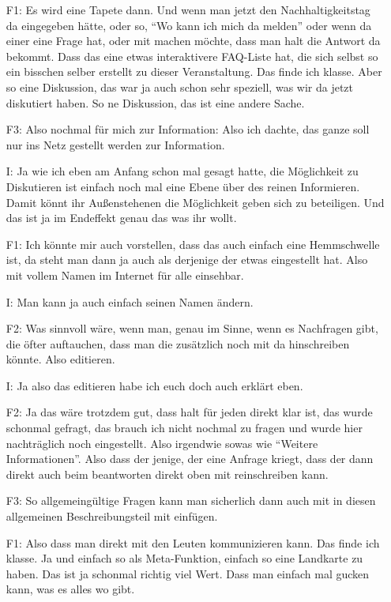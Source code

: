 \begin{itemize}
    \item[F1:] Es wird eine Tapete dann. Und wenn man jetzt den Nachhaltigkeitstag da eingegeben h{\"a}tte, oder so, "`Wo kann ich mich da melden"' oder wenn da einer eine Frage hat, oder mit machen m{\"o}chte, dass man halt die Antwort da bekommt. Dass das eine etwas interaktivere FAQ-Liste hat, die sich selbst so ein bisschen selber erstellt zu dieser Veranstaltung. Das finde ich klasse. Aber so eine Diskussion, das war ja auch schon sehr speziell, was wir da jetzt diskutiert haben. So ne Diskussion, das ist eine andere Sache.
    \item[F3:] Also nochmal f{\"u}r mich zur Information: Also ich dachte, das ganze soll nur ins Netz gestellt werden zur Information.
    \item[I:] Ja wie ich eben am Anfang schon mal gesagt hatte, die M{\"o}glichkeit zu Diskutieren ist einfach noch mal eine Ebene {\"u}ber des reinen Informieren. Damit k{\"o}nnt ihr Au{\ss}enstehenen die M{\"o}glichkeit geben sich zu beteiligen. Und das ist ja im Endeffekt genau das was ihr wollt.
    \item[F1:] Ich k{\"o}nnte mir auch vorstellen, dass das auch einfach eine Hemmschwelle ist, da steht man dann ja auch als derjenige der etwas eingestellt hat. Also mit vollem Namen im Internet f{\"u}r alle einsehbar.
    \item[I:] Man kann ja auch einfach seinen Namen {\"a}ndern.
    \item[F2:] Was sinnvoll w{\"a}re, wenn man, genau im Sinne, wenn es Nachfragen gibt, die {\"o}fter auftauchen, dass man die zus{\"a}tzlich noch mit da hinschreiben k{\"o}nnte. Also editieren.
    \item[I:] Ja also das editieren habe ich euch doch auch erkl{\"a}rt eben.
    \item[F2:] Ja das w{\"a}re trotzdem gut, dass halt f{\"u}r jeden direkt klar ist, das wurde schonmal gefragt, das brauch ich nicht nochmal zu fragen und wurde hier nachtr{\"a}glich noch eingestellt. Also irgendwie sowas wie "`Weitere Informationen"'. Also dass der jenige, der eine Anfrage kriegt, dass der dann direkt auch beim beantworten direkt oben mit reinschreiben kann.
    \item[F3:] So allgemeing{\"u}ltige Fragen kann man sicherlich dann auch mit in diesen allgemeinen Beschreibungsteil mit einf{\"u}gen.
    \item[F1:] Also dass man direkt mit den Leuten kommunizieren kann. Das finde ich klasse. Ja und einfach so als Meta-Funktion, einfach so eine Landkarte zu haben. Das ist ja schonmal richtig viel Wert. Dass man einfach mal gucken kann, was es alles wo gibt.

\end{itemize}
